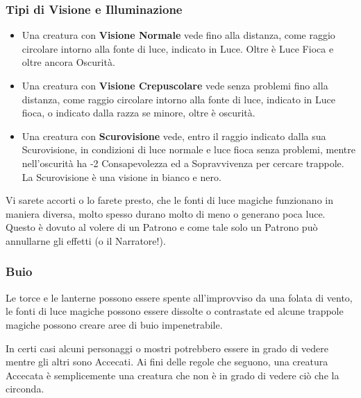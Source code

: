 \begin{multicols}{2}
\subsubsection{Tipi di Visione e Illuminazione}

\begin{itemize}[leftmargin=*] \setlength{\itemsep}{0pt}
\item
Una creatura con \textbf{Visione Normale} vede fino alla distanza, come raggio circolare intorno alla fonte di luce, indicato in Luce. Oltre è Luce Fioca e oltre ancora Oscurità.

\item
Una creatura con \textbf{Visione Crepuscolare} vede senza problemi fino alla distanza, come raggio circolare intorno alla fonte di luce, indicato in Luce fioca, o indicato dalla razza se minore, oltre è oscurità.

\item
Una creatura con \textbf{Scurovisione}  vede, entro il raggio indicato dalla sua Scurovisione, in condizioni di luce normale e luce fioca senza problemi, mentre nell'oscurità ha -2 Consapevolezza ed a Sopravvivenza per cercare trappole. La Scurovisione è una visione in bianco e nero.
\end{itemize}

\begin{changemargin}{0.3cm}{0.3cm}\begin{tcolorbox}[title = Nota sulle fonti di luce]
Vi sarete accorti o lo farete presto, che le fonti di luce magiche funzionano in maniera diversa, molto spesso durano molto di meno o generano poca luce. Questo è dovuto al volere di un Patrono e come tale solo un Patrono può annullarne gli effetti (o il Narratore!).
\end{tcolorbox}\end{changemargin}

\subsubsection{Buio}

\label{buio}

Le torce e le lanterne possono essere spente all'improvviso da una folata di vento, le fonti di luce magiche possono essere dissolte o contrastate ed alcune trappole magiche possono creare aree di buio impenetrabile.

In certi casi alcuni personaggi o mostri potrebbero essere in grado di vedere mentre gli altri sono Accecati. Ai fini delle regole che seguono, una creatura Accecata è semplicemente una creatura che non è in grado di vedere ciò che la circonda.


\end{multicols}
